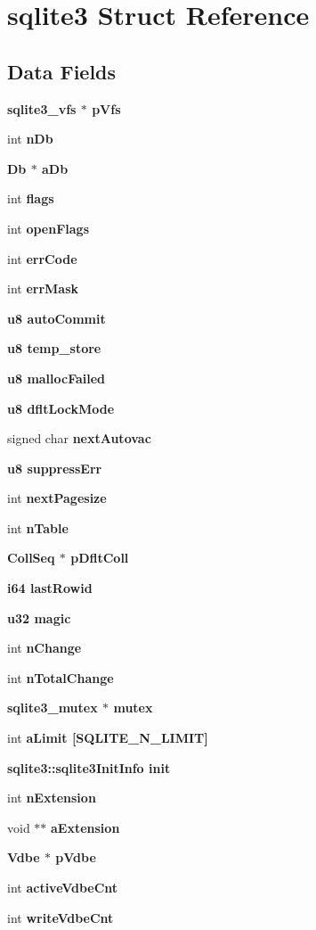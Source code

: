 \section{sqlite3 Struct Reference}
\label{structsqlite3}
\subsection*{Data Fields}
\begin{CompactItemize}
\item 
\bf{sqlite3\_\-vfs} $\ast$ \bf{p\-Vfs}
\item 
int \bf{n\-Db}
\item 
\bf{Db} $\ast$ \bf{a\-Db}
\item 
int \bf{flags}
\item 
int \bf{open\-Flags}
\item 
int \bf{err\-Code}
\item 
int \bf{err\-Mask}
\item 
\bf{u8} \bf{auto\-Commit}
\item 
\bf{u8} \bf{temp\_\-store}
\item 
\bf{u8} \bf{malloc\-Failed}
\item 
\bf{u8} \bf{dflt\-Lock\-Mode}
\item 
signed char \bf{next\-Autovac}
\item 
\bf{u8} \bf{suppress\-Err}
\item 
int \bf{next\-Pagesize}
\item 
int \bf{n\-Table}
\item 
\bf{Coll\-Seq} $\ast$ \bf{p\-Dflt\-Coll}
\item 
\bf{i64} \bf{last\-Rowid}
\item 
\bf{u32} \bf{magic}
\item 
int \bf{n\-Change}
\item 
int \bf{n\-Total\-Change}
\item 
\bf{sqlite3\_\-mutex} $\ast$ \bf{mutex}
\item 
int \bf{a\-Limit} [SQLITE\_\-N\_\-LIMIT]
\item 
\bf{sqlite3::sqlite3Init\-Info} \bf{init}
\item 
int \bf{n\-Extension}
\item 
void $\ast$$\ast$ \bf{a\-Extension}
\item 
\bf{Vdbe} $\ast$ \bf{p\-Vdbe}
\item 
int \bf{active\-Vdbe\-Cnt}
\item 
int \bf{write\-Vdbe\-Cnt}
\item 
$$
\end{CompactItemize}
